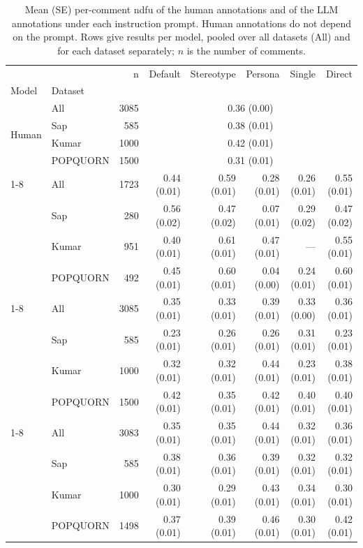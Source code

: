 \begin{table}[t]
\small
\centering
\caption{Mean (SE) per-comment \ac{ndfu} of the human annotations and of the LLM annotations under each instruction prompt. Human annotations do not depend on the prompt. Rows give results per model, pooled over all datasets (All) and for each dataset separately; $n$ is the number of comments.}
\label{tab:mean-ndfu-by-prompt}
\begin{tabular}{llrrrrrr}
\toprule
 &  & n & Default & Stereotype & Persona & Single & Direct \\
Model & Dataset &  &  &  &  &  &  \\
\midrule
\multirow[t]{4}{*}{Human} & All & 3085 & \multicolumn{5}{c}{0.36 (0.00)} \\
 & Sap & 585 & \multicolumn{5}{c}{0.38 (0.01)} \\
 & Kumar & 1000 & \multicolumn{5}{c}{0.42 (0.01)} \\
 & POPQUORN & 1500 & \multicolumn{5}{c}{0.31 (0.01)} \\
\cline{1-8}
\multirow[t]{4}{*}{Llama 8B} & All & 1723 & 0.44 (0.01) & 0.59 (0.01) & 0.28 (0.01) & 0.26 (0.01) & 0.55 (0.01) \\
 & Sap & 280 & 0.56 (0.02) & 0.47 (0.02) & 0.07 (0.01) & 0.29 (0.02) & 0.47 (0.02) \\
 & Kumar & 951 & 0.40 (0.01) & 0.61 (0.01) & 0.47 (0.01) & --- & 0.55 (0.01) \\
 & POPQUORN & 492 & 0.45 (0.01) & 0.60 (0.01) & 0.04 (0.00) & 0.24 (0.01) & 0.60 (0.01) \\
\cline{1-8}
\multirow[t]{4}{*}{OLMo 32B} & All & 3085 & 0.35 (0.01) & 0.33 (0.01) & 0.39 (0.01) & 0.33 (0.00) & 0.36 (0.01) \\
 & Sap & 585 & 0.23 (0.01) & 0.26 (0.01) & 0.26 (0.01) & 0.31 (0.01) & 0.23 (0.01) \\
 & Kumar & 1000 & 0.32 (0.01) & 0.32 (0.01) & 0.44 (0.01) & 0.23 (0.01) & 0.38 (0.01) \\
 & POPQUORN & 1500 & 0.42 (0.01) & 0.35 (0.01) & 0.42 (0.01) & 0.40 (0.01) & 0.40 (0.01) \\
\cline{1-8}
\multirow[t]{4}{*}{OLMo 7B} & All & 3083 & 0.35 (0.01) & 0.35 (0.01) & 0.44 (0.01) & 0.32 (0.01) & 0.36 (0.01) \\
 & Sap & 585 & 0.38 (0.01) & 0.36 (0.01) & 0.39 (0.01) & 0.32 (0.01) & 0.32 (0.01) \\
 & Kumar & 1000 & 0.30 (0.01) & 0.29 (0.01) & 0.43 (0.01) & 0.34 (0.01) & 0.30 (0.01) \\
 & POPQUORN & 1498 & 0.37 (0.01) & 0.39 (0.01) & 0.46 (0.01) & 0.30 (0.01) & 0.42 (0.01) \\

\end{tabular}
\end{table}
